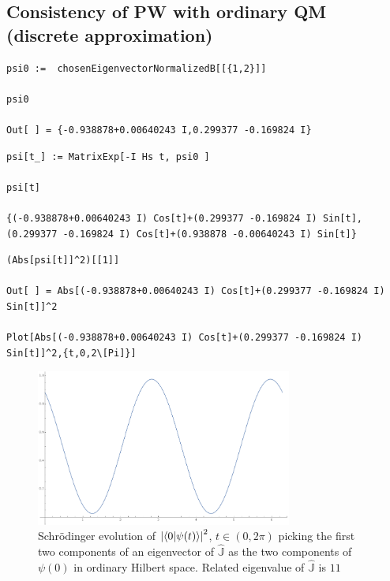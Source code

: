 \subsection{Consistency of PW with ordinary QM (discrete approximation)}

\begin{lstlisting}
psi0 :=  chosenEigenvectorNormalizedB[[{1,2}]]

psi0

Out[ ] = {-0.938878+0.00640243 I,0.299377 -0.169824 I}
\end{lstlisting}

\begin{lstlisting}
psi[t_] := MatrixExp[-I Hs t, psi0 ]

psi[t]

{(-0.938878+0.00640243 I) Cos[t]+(0.299377 -0.169824 I) Sin[t],(0.299377 -0.169824 I) Cos[t]+(0.938878 -0.00640243 I) Sin[t]}
\end{lstlisting}

\begin{lstlisting}
(Abs[psi[t]]^2)[[1]]

Out[ ] = Abs[(-0.938878+0.00640243 I) Cos[t]+(0.299377 -0.169824 I) Sin[t]]^2

Plot[Abs[(-0.938878+0.00640243 I) Cos[t]+(0.299377 -0.169824 I) Sin[t]]^2,{t,0,2\[Pi]}]
\end{lstlisting}
\begin{figure}[h]
  \centering
  \includegraphics[width=0.75\textwidth]{img/probB_0.png}
  \caption[(from notebook)]{
    Schr{\"o}dinger evolution of
    $\qty|\braket{0}{\psi(t)}|^2$, $t \in (0, 2\pi) $
    picking the first two components of an eigenvector of $\hat{\mathbb{J}}$
    as the two components of $\psi(0)$ in ordinary Hilbert space.
    Related eigenvalue of $\hat{\mathbb{J}}$ is $11$
  }
\end{figure}


